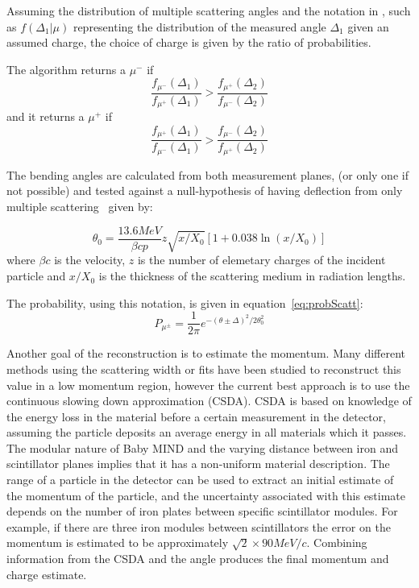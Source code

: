 Assuming the distribution of multiple scattering angles and the notation in , such as $f(\Delta_1 | \mu )$ representing the distribution of the measured angle $\Delta_1$ given an assumed charge, the choice of charge is given by the ratio of probabilities.

The algorithm returns a $\mu^-$ if 
\begin{equation}
\frac{f_{\mu^-}(\Delta_1)}{f_{\mu^+}(\Delta_1)} > \frac{f_{\mu^+}(\Delta_2)}{f_{\mu^-}(\Delta_2)}
\end{equation}
and it returns a $\mu^+$ if
\begin{equation}
\frac{f_{\mu^+}(\Delta_1)}{f_{\mu^-}(\Delta_1)} > \frac{f_{\mu^-}(\Delta_2)}{f_{\mu^+}(\Delta_2)}
\end{equation}



The bending angles are calculated from both measurement planes, (or only one if not possible) and tested against a null-hypothesis of having deflection from only multiple scattering~\cite{13PDG} given by:

\begin{equation}
\theta_0 = \frac{13.6 MeV}{\beta cp} z \sqrt{x/X_0}[1+0.038\ln(x/X_0)]
\end{equation}
where $\beta c$ is the velocity, $z$ is the number of elemetary charges of the incident particle and $x/X_0$ is the thickness of the scattering medium in radiation lengths.

The probability, using this notation, is given in equation~\ref{eq:probScatt}:
\begin{equation}
P_{\mu^\pm} = \frac{1}{2\pi} e^{-(\theta\pm\Delta)^2 / 2\theta_0^2}
\label{eq:probScatt}
\end{equation}

Another goal of the reconstruction is to estimate the momentum. Many different methods using the scattering width or fits have been studied to reconstruct this value in a low momentum region, however the current best approach is to use the continuous slowing down approximation (CSDA). CSDA is based on knowledge of the energy loss in the material before a certain measurement in the detector, assuming the particle deposits an average energy in all materials which it passes. The modular nature of Baby MIND and the varying distance between iron and scintillator planes implies that it has a non-uniform material description. The range of a particle in the detector can be used to extract an initial estimate of the momentum of the particle, and the uncertainty associated with this estimate depends on the number of iron plates between specific scintillator modules. For example, if there are three iron modules between scintillators the error on the momentum is estimated to be approximately $\sqrt{2} \times 90 MeV/c$. Combining information from the CSDA and the angle produces the final momentum and charge estimate.

